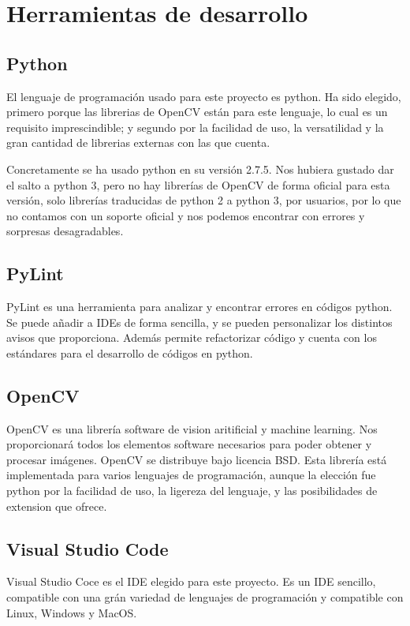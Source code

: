 \section{Herramientas de desarrollo}

\subsection{Python}
El lenguaje de programación usado para este proyecto es python. Ha sido elegido, primero porque las librerias de OpenCV están para este lenguaje, lo cual es un requisito imprescindible; y segundo por la facilidad de uso, la versatilidad y la gran cantidad de librerias externas con las que cuenta.

Concretamente se ha usado python en su versión 2.7.5.
Nos hubiera gustado dar el salto a python 3, pero no hay librerías de OpenCV de forma oficial para esta versión, solo librerías traducidas de python 2 a python 3, por usuarios, por lo que no contamos con un soporte oficial y nos podemos encontrar con errores y sorpresas desagradables.


\subsection{PyLint}
PyLint es una herramienta para analizar y encontrar errores en códigos python. Se puede añadir a IDEs de forma sencilla, y se pueden personalizar los distintos avisos que proporciona. 
Además permite refactorizar código y cuenta con los estándares para el desarrollo de códigos en python.

\subsection{OpenCV}
OpenCV es una librería software de vision aritificial y machine learning. Nos proporcionará todos los elementos software necesarios para poder obtener y procesar imágenes. 
OpenCV se distribuye bajo licencia BSD. 
Esta librería está implementada para varios lenguajes de programación, aunque la elección fue python por la facilidad de uso, la ligereza del lenguaje, y las posibilidades de extension que ofrece.

\subsection{Visual Studio Code}
Visual Studio Coce es el IDE elegido para este proyecto. Es un IDE sencillo, compatible con una grán variedad de lenguajes de programación y compatible con Linux, Windows y MacOS.
 
